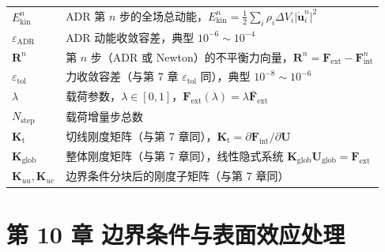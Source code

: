 {\begin{longtable}{@{}p{4.8cm}>{\raggedright\arraybackslash}p{10.2cm}@{}}
  $E_{\text{kin}}^{n}$ & ADR 第 $n$ 步的全场总动能，$E_{\text{kin}}^{n}=\frac{1}{2}\sum_i\rho_i\Delta V_i\lvert\dot{\mathbf{u}}_i^{n}\rvert^{2}$ \\
  $\varepsilon_{\text{ADR}}$ & ADR 动能收敛容差，典型 $10^{-6}\sim10^{-4}$ \\
  $\mathbf{R}^{n}$ & 第 $n$ 步（ADR 或 Newton）的不平衡力向量，$\mathbf{R}^{n}=\mathbf{F}_{\text{ext}}-\mathbf{F}_{\text{int}}^{n}$ \\
  $\varepsilon_{\text{tol}}$ & 力收敛容差（与第 7 章 $\varepsilon_{\mathrm{tol}}$ 同），典型 $10^{-8}\sim10^{-6}$ \\
  $\lambda$ & 载荷参数，$\lambda\in[0,1]$，$\mathbf{F}_{\text{ext}}(\lambda)=\lambda\bar{\mathbf{F}}_{\text{ext}}$ \\
  $N_{\text{step}}$ & 载荷增量步总数 \\
  $\mathbf{K}_{\mathrm{t}}$ & 切线刚度矩阵（与第 7 章同），$\mathbf{K}_{\mathrm{t}}=\partial\mathbf{F}_{\mathrm{int}}/\partial\mathbf{U}$ \\
  $\mathbf{K}_{\mathrm{glob}}$ & 整体刚度矩阵（与第 7 章同），线性隐式系统 $\mathbf{K}_{\mathrm{glob}}\mathbf{U}_{\mathrm{glob}}=\mathbf{F}_{\mathrm{ext}}$ \\
  $\mathbf{K}_{uu},\mathbf{K}_{uc}$ & 边界条件分块后的刚度子矩阵（与第 7 章同） \\
\end{longtable}

\section*{第 10 章 边界条件与表面效应处理}

}
